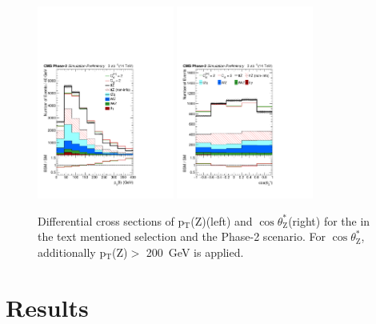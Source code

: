 \documentclass[letterpaper,11pt]{article}
\def\pTZ{p$_\text{T}$(Z)\xspace}
\def\cosThetaStar{$\cos\theta^*_\text{Z}$\xspace}
\def\GeV{GeV\xspace}
\begin{document}
\begin{figure}[tbp]
  \centering
    \includegraphics[trim={0.2cm 1.cm 0.4cm 0.cm},clip,width=0.40\textwidth]{Figures/Z_pt_lin.pdf}
    \hspace{1.7cm}
    \includegraphics[trim={0.2cm 1.cm 0.4cm 0.cm},clip,width=0.40\textwidth]{Figures/Z_costheta_lin_ptZ200.pdf}
    \hspace{.3cm}
\caption{
Differential cross sections of \pTZ (left) and \cosThetaStar (right) for the in the text mentioned selection and the Phase-2 scenario.
For \cosThetaStar, additionally \pTZ $>$ 200~\GeV is applied. 
}\label{fig:ttZ_pt_cos}
\end{figure}

\section{Results}
\label{sec:results}
\end{document}
